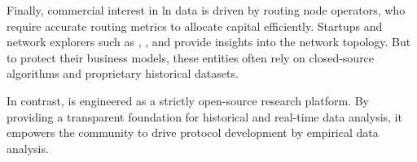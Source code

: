 Finally, commercial interest in \gls{ln} data is driven by routing node operators, 
who require accurate routing metrics to allocate capital efficiently. 
Startups and network explorers such as , , 
and  provide insights into the network topology. 
But to protect their business models, these entities often rely on closed-source 
algorithms and proprietary historical datasets. 

In contrast,  is engineered as a strictly open-source research platform. 
By providing a transparent foundation for historical and real-time data analysis, 
it empowers the community to drive protocol development by empirical data analysis.

